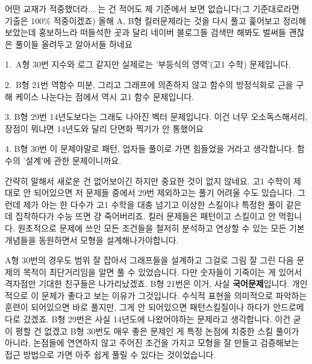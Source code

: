 \vspace{5mm}

어떤 교재가 적중했더라... 는 건 적어도 제 기준에서 보면 없습니다(그 기준대로라면 기출은 100$\%$ 적중이겠죠)
올해 A, B형 킬러문제라는 것을 다시 풀고 훑어보고 정리해보았는데
홍보하느라 떠들석한 곳과 달리 네이버 블로그들 검색만 해봐도 벌써들 괜찮은 풀이들 올려두고 알아서들 하네요
\vspace{5mm}

\item 1. A형 30번
지수와 로그 같지만 실제로는 '부등식의 영역'(고1 수학) 문제입니다.
\vspace{5mm}

\item 2. B형 21번
역함수 미분, 그리고 그래프에 의존하지 않고 함수의 방정식화로 근을 구해 케이스 나눈다는 점에서 역시 고1 함수 문제입니다.
\vspace{5mm}

\item 3. B형 29번
14년도보다는 그래도 나아진 벡터 문제입니다. 이건 너무 오소독스해서리, 장점이 뭐냐면 14년도와 달리 단면화 찍기가 안 통했어요
\vspace{5mm}

\item 4. B형 30번
이 문제야말로 패턴, 업자들 풀이로 가면 힘들었을 거라고 생각합니다. 함수의 '설계'에 관한 문제이니까요.
\vspace{5mm}

간략히 말해서 새로운 건 없어보이긴 하지만 중요한 것이 없지 않네요.
고1 수학이 제대로 안 되어있으면 저 문제들 중에서 29번 제외하고는 풀기 어려울 수도 있습니다.
그런데 제가 아는 한 다수가 고1 수학을 대충 넘기고 이상한 스킬이나 특정한 풀이 같은 데 집착하다가 수능 뜨면 걍 죽어버리죠.
킬러 문제들은 패턴이고 스킬이고 안 먹힙니다. 원초적으로 문제에 쓰인 모든 조건들을 철저히 분석하고
연상할 수 있는 모든 기본 개념들을 동원하면서 모형을 설계해나가야합니다.
\vspace{5mm}

A형 30번의 경우도 범위 잘 잡아서 그래프들을 설계하고 그걸로 그림 잘 그린 다음
문제의 목적이 최단거리임을 알면 풀 수 있었습니다. 다만 숫자들이 기죽이는 게 있어서 격자점만 기대한 친구들은 나가리났겠죠.
B형 21번은 이거, 사실 \textbf{국어문제}입니다. 개인적으로 이 문제가 좋다고 보는 이유가 그것입니다.
수식적 표현을 의미적으로 파악하는 훈련이 되어있으면 바로 풀지만, 그게 안 되어있으면 패턴스킬질이나 하다가 안드로메다로 갔겠죠.
B형 29번은 사실 14년도에 나왔어야하는 문제라고 생각합니다. 이건 굳이 평할 건 없겠고
B형 30번도 매우 좋은 문제인 게 특정 논점에 치중한 스킬 풀이가 아니라, 논점들에 연연하지 않고
주어진 조건을 가지고 모형을 잘 만들고 검증해보는 접근 방법으로 가면 아주 쉽게 풀릴 수 있다는 것이었습니다.
\vspace{5mm}

